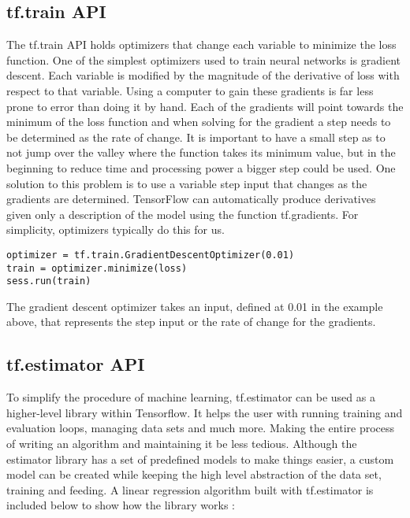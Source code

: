 \subsection{tf.train API}
The tf.train API holds optimizers that change each variable to minimize the loss function.
One of the simplest optimizers used to train neural networks is gradient descent.
Each variable is modified by the magnitude of the derivative of loss with respect to that variable.
Using a computer to gain these gradients is far less prone to error than doing it by hand.
Each of the gradients will point towards the minimum of the loss function and when solving for the gradient a step needs to be determined as the rate of change.
It is important to  have a small step as to not jump over the valley where the function takes its minimum value,
but in the beginning to reduce time and processing power a bigger step could be used.
One solution to this problem is to use a variable step input that changes as the gradients are determined.
TensorFlow can automatically produce derivatives given only a description of the model using the function tf.gradients.
For simplicity, optimizers typically do this for us.
\begin{lstlisting}
optimizer = tf.train.GradientDescentOptimizer(0.01)
train = optimizer.minimize(loss)
sess.run(train)
\end{lstlisting}
The gradient descent optimizer takes an input, defined at 0.01 in the example above,
that represents the step input or the rate of change for the gradients.

\subsection{tf.estimator API}
To simplify the procedure of machine learning,
tf.estimator can be used as a higher-level library within Tensorflow.
It helps the user with running training and evaluation loops, managing data sets and much more. 
Making the entire process of writing an algorithm and maintaining it be less tedious.
Although the estimator library has a set of predefined models to make things easier, a custom model can be created while keeping the high
level abstraction of the data set, training and feeding.
A linear regression algorithm built with tf.estimator is included below to show how the library works \cite{Estimator}:

